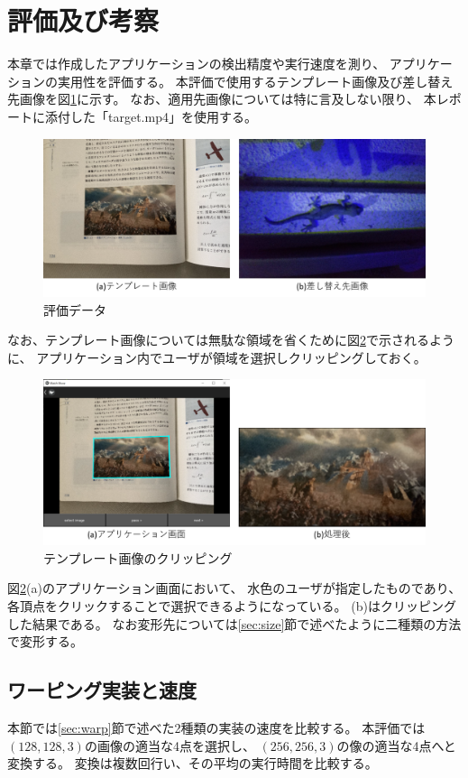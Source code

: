 \section{評価及び考察}\label{sec:eval}
本章では作成したアプリケーションの検出精度や実行速度を測り、
アプリケーションの実用性を評価する。
本評価で使用するテンプレート画像及び差し替え先画像を図\ref{fig:data}に示す。
なお、適用先画像については特に言及しない限り、
本レポートに添付した「target.mp4」を使用する。
\begin{figure}[h]
    \centering
    \includegraphics[width=1\linewidth]{fig/data.png}
    \caption{評価データ}
    \label{fig:data}
\end{figure}
なお、テンプレート画像については無駄な領域を省くために図\ref{fig:clip}で示されるように、
アプリケーション内でユーザが領域を選択しクリッピングしておく。
\begin{figure}[h]
    \centering
    \includegraphics[width=1\linewidth]{fig/clip.png}
    \caption{テンプレート画像のクリッピング}
    \label{fig:clip}
\end{figure}
図\ref{fig:clip}(a)のアプリケーション画面において、
水色のユーザが指定したものであり、
各頂点をクリックすることで選択できるようになっている。
(b)はクリッピングした結果である。
なお変形先については\ref{sec:size}節で述べたように二種類の方法で変形する。

\subsection{ワーピング実装と速度}
本節では\ref{sec:warp}節で述べた2種類の実装の速度を比較する。
本評価では$(128, 128, 3)$の画像の適当な4点を選択し、
$(256, 256, 3)$の像の適当な4点へと変換する。
変換は複数回行い、その平均の実行時間を比較する。

